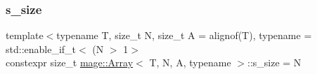 \subsubsection{\texorpdfstring{s\+\_\+size}{s\_size}}
{\footnotesize\ttfamily template$<$typename T, size\+\_\+t N, size\+\_\+t A = alignof(\+T), typename  = std\+::enable\+\_\+if\+\_\+t$<$ (\+N $>$ 1$>$ \\
constexpr size\+\_\+t \mbox{\hyperlink{structmage_1_1_array}{mage\+::\+Array}}$<$ T, N, A, typename $>$\+::s\+\_\+size = N\hspace{0.3cm}{\ttfamily [static]}}

